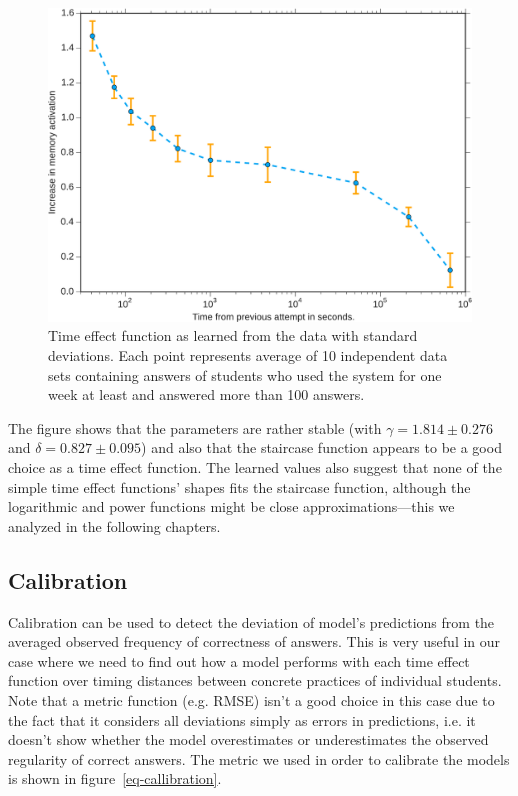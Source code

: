 \begin{figure}[htbp]
  \centering
  \includegraphics[width=\textwidth]{img/learned-time-effect-function}
  \caption{Time effect function as learned from the data with standard deviations. Each point represents average of 10 independent data sets containing answers of students who used the system for one week at least and answered more than 100 answers.}
  \label{fig:learned-time-effect-function}
\end{figure}

The figure shows that the parameters are rather stable (with $\gamma = 1.814 \pm 0.276$ and $\delta = 0.827 \pm 0.095$) and also that the staircase function appears to be a good choice as a time effect function. The learned values also suggest that none of the simple time effect functions' shapes fits the staircase function, although the logarithmic and power functions might be close approximations---this we analyzed in the following chapters.

\subsection{Calibration}
\label{memory-calibration}

Calibration can be used to detect the deviation of model's predictions from the averaged observed frequency of correctness of answers. This is very useful in our case where we need to find out how a model performs with each time effect function over timing distances between concrete practices of individual students. Note that a metric function (e.g. RMSE) isn't a good choice in this case due to the fact that it considers all deviations simply as errors in predictions, i.e. it doesn't show whether the model overestimates or underestimates the observed regularity of correct answers. The metric we used in order to calibrate the models is shown in figure~\ref{eq-callibration}.

